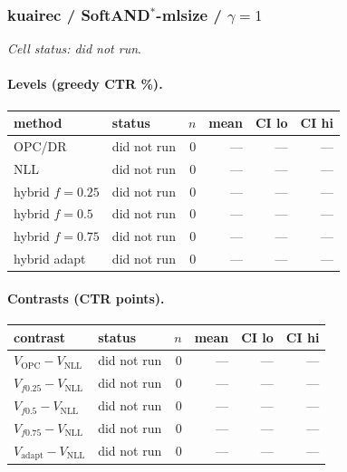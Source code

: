 \documentclass[10pt,a4paper]{article}
\begin{document}
\subsubsection{kuairec / SoftAND$^*$-mlsize / $\gamma=1$}
\emph{Cell status: did not run}.
\paragraph{Levels (greedy CTR \%).}
{\centering\small\begin{tabular}{llrrrr}
\toprule method & status & $n$ & mean & CI lo & CI hi \\
\midrule
OPC/DR & did not run & 0 & --- & --- & --- \\
NLL & did not run & 0 & --- & --- & --- \\
hybrid $f{=}0.25$ & did not run & 0 & --- & --- & --- \\
hybrid $f{=}0.5$ & did not run & 0 & --- & --- & --- \\
hybrid $f{=}0.75$ & did not run & 0 & --- & --- & --- \\
hybrid adapt & did not run & 0 & --- & --- & --- \\
\bottomrule\end{tabular}\par}
\paragraph{Contrasts (CTR points).}
{\centering\small\begin{tabular}{llrrrr}
\toprule contrast & status & $n$ & mean & CI lo & CI hi \\
\midrule
$V_{\mathrm{OPC}}-V_{\mathrm{NLL}}$ & did not run & 0 & --- & --- & --- \\
$V_{f0.25}-V_{\mathrm{NLL}}$ & did not run & 0 & --- & --- & --- \\
$V_{f0.5}-V_{\mathrm{NLL}}$ & did not run & 0 & --- & --- & --- \\
$V_{f0.75}-V_{\mathrm{NLL}}$ & did not run & 0 & --- & --- & --- \\
$V_{\mathrm{adapt}}-V_{\mathrm{NLL}}$ & did not run & 0 & --- & --- & --- \\
\bottomrule\end{tabular}\par}
\end{document}
